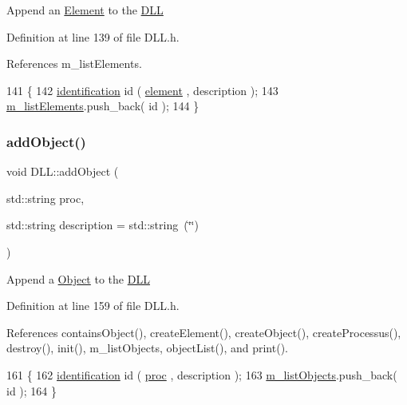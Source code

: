 Append an \hyperlink{classElement}{Element} to the \hyperlink{classDLL}{D\+LL} 

Definition at line 139 of file D\+L\+L.\+h.



References m\+\_\+list\+Elements.


\begin{DoxyCode}
141   \{
142     \hyperlink{classDLL_aa2df9e9226052bfa93a6df56f1ca689b}{identification} id ( \hyperlink{namespaceelement}{element} , description );
143     \hyperlink{classDLL_a2e88d7167245fd7b6a000817583643ed}{m\_listElements}.push\_back( \textcolor{keywordtype}{id} );
144   \}
\end{DoxyCode}
\mbox{\label{classDLL_a76bd3e49e5e0046b017aa18afdc55a41}} 
\subsubsection{\texorpdfstring{add\+Object()}{addObject()}}
{\footnotesize\ttfamily void D\+L\+L\+::add\+Object (\begin{DoxyParamCaption}\item[{std\+::string}]{proc,  }\item[{std\+::string}]{description = {\ttfamily std\+:\+:string~(\char`\"{}\char`\"{})} }\end{DoxyParamCaption})\hspace{0.3cm}{\ttfamily [inline]}}

Append a \hyperlink{classObject}{Object} to the \hyperlink{classDLL}{D\+LL} 

Definition at line 159 of file D\+L\+L.\+h.



References contains\+Object(), create\+Element(), create\+Object(), create\+Processus(), destroy(), init(), m\+\_\+list\+Objects, object\+List(), and print().


\begin{DoxyCode}
161     \{
162     \hyperlink{classDLL_aa2df9e9226052bfa93a6df56f1ca689b}{identification} id ( \hyperlink{namespaceproc}{proc} , description ); 
163     \hyperlink{classDLL_af48201f52f29a849489e0104a440bcbb}{m\_listObjects}.push\_back( \textcolor{keywordtype}{id} );
164   \}
\end{DoxyCode}
\mbox{\label{classDLL_a1f08b909c1569631b6b6b84b52409e33}} 
